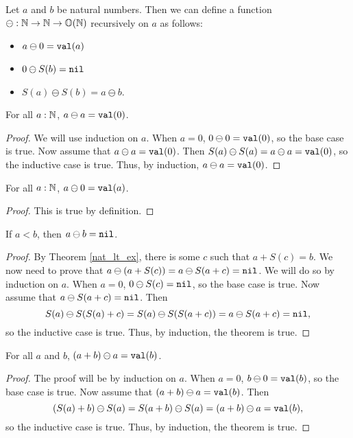 \documentclass[../math.tex]{subfiles}
\begin{document}
\begin{definition}
    Let $a$ and $b$ be natural numbers.  Then we can define a function $\ominus
    : \mathbb{N} \rightarrow \mathbb{N} \rightarrow \mathbb{O}(\mathbb{N})$ recursively on $a$ as
    follows:
    \begin{itemize}
        \item $a \ominus 0 = \val a$
        \item $0 \ominus S(b) = \nil$
        \item $S(a) \ominus S(b) = a \ominus b$.
    \end{itemize}
\end{definition}

\begin{theorem} \label{nat_minus_eq}
    For all $a : \mathbb{N}$, $a \ominus a = \val 0$.
\end{theorem}
\begin{proof}
    We will use induction on $a$.  When $a = 0$, $0 \ominus 0 = \val 0$,
    so the base case is true.  Now assume that $a \ominus a = \val 0$.  Then
    $S(a) \ominus S(a) = a \ominus a = \val 0$, so the inductive case is true.
    Thus, by induction, $a \ominus a = \val 0$.
\end{proof}

\begin{theorem} \label{nat_minus_zero}
    For all $a : \mathbb{N}$, $a \ominus 0 = \val a$.
\end{theorem}
\begin{proof}
    This is true by definition.
\end{proof}

\begin{theorem} \label{nat_minus_lt}
    If $a < b$, then $a \ominus b = \nil$.
\end{theorem}
\begin{proof}
    By Theorem \ref{nat_lt_ex}, there is some $c$ such that $a + S(c) = b$.  We
    now need to prove that $a \ominus (a + S(c)) = a \ominus S(a + c) = \nil$.
    We will do so by induction on $a$.  When $a = 0$, $0 \ominus S(c) = \nil$,
    so the base case is true.  Now assume that $a \ominus S(a + c) = \nil$.
    Then
    \[
        S(a) \ominus S(S(a) + c) = S(a) \ominus S(S(a + c)) = a \ominus S(a + c)
        = \nil,
    \]
    so the inductive case is true.  Thus, by induction, the theorem is true.
\end{proof}

\begin{theorem} \label{nat_minus_plus}
    For all $a$ and $b$, $(a + b) \ominus a = \val b$.
\end{theorem}
\begin{proof}
    The proof will be by induction on $a$.  When $a = 0$, $b \ominus 0 = \val
    b$, so the base case is true.  Now assume that $(a + b) \ominus a = \val b$.
    Then
    \[
        (S(a) + b) \ominus S(a) = S(a + b) \ominus S(a) = (a + b) \ominus a =
        \val b,
    \]
    so the inductive case is true.  Thus, by induction, the theorem is true.
\end{proof}
\end{document}
